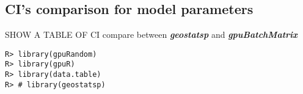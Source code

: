 \documentclass{article}\usepackage[]{graphicx}\usepackage[]{color}
\makeatletter
\newenvironment{kframe}{%
 \def\at@end@of@kframe{}%
 \ifinner\ifhmode%
  \def\at@end@of@kframe{\end{minipage}}%
  \begin{minipage}{\columnwidth}%
 \fi\fi%
 \def\FrameCommand##1{\hskip\@totalleftmargin \hskip-\fboxsep
 \colorbox{shadecolor}{##1}\hskip-\fboxsep
     \hskip-\linewidth \hskip-\@totalleftmargin \hskip\columnwidth}%
 \MakeFramed {\advance\hsize-\width
   \@totalleftmargin\z@ \linewidth\hsize
   \@setminipage}}%
 {\par\unskip\endMakeFramed%
 \at@end@of@kframe}
\newenvironment{knitrout}{}{} %
\newcommand{\pkg}[1]{\textbf{\emph{#1}}}
\def\T{{\footnotesize {^{_{\sf T}}}}}
\makeatother
\begin{document}
% 





\subsection{CI’s comparison for model parameters}


SHOW A TABLE OF CI compare between \pkg{geostatsp} and \pkg{gpuBatchMatrix}


\begin{knitrout}
\color{fgcolor}\begin{kframe}
\begin{verbatim}
R> library(gpuRandom)
R> library(gpuR)
R> library(data.table)
R> # library(geostatsp)
\end{verbatim}
\end{kframe}
\end{knitrout}


\end{document}
